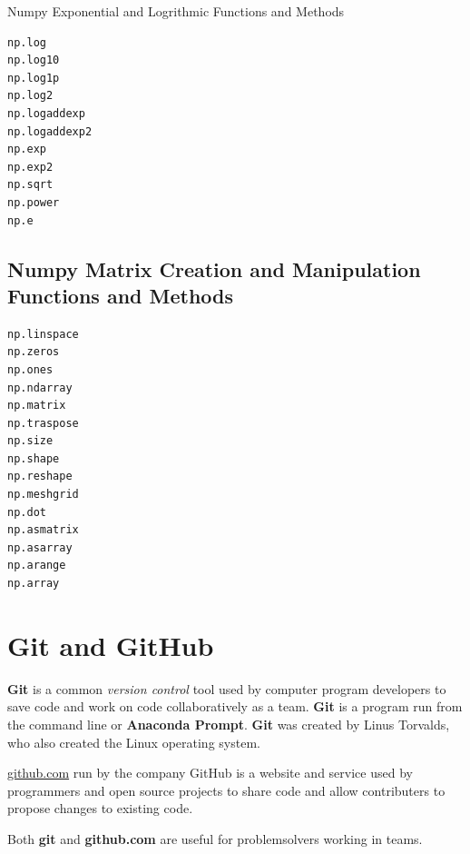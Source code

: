 \documentclass{book}
\begin{document}
    
        Numpy Exponential and Logrithmic Functions and Methods
    




    
        \begin{lstlisting}
np.log
np.log10
np.log1p
np.log2
np.logaddexp
np.logaddexp2
np.exp
np.exp2
np.sqrt
np.power
np.e
\end{lstlisting}
    




    
        \subsection{Numpy Matrix Creation and Manipulation Functions and
Methods}\label{numpy-matrix-creation-and-manipulation-functions-and-methods}
    




    
        \begin{lstlisting}
np.linspace
np.zeros
np.ones
np.ndarray
np.matrix
np.traspose
np.size
np.shape
np.reshape
np.meshgrid
np.dot
np.asmatrix
np.asarray
np.arange
np.array
\end{lstlisting}
    




    
        \section{Git and GitHub}\label{git-and-github}
    




    
        \textbf{Git} is a common \emph{version control} tool used by computer
program developers to save code and work on code collaboratively as a
team. \textbf{Git} is a program run from the command line or
\textbf{Anaconda Prompt}. \textbf{Git} was created by Linus Torvalds,
who also created the Linux operating system.
    




    
        \href{https://github.com/}{github.com} run by the company GitHub is a
website and service used by programmers and open source projects to
share code and allow contributers to propose changes to existing code.
    




    
        Both \textbf{git} and \textbf{github.com} are useful for problemsolvers
working in teams.
    
\end{document}
